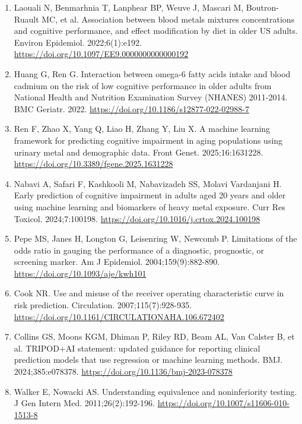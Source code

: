 \documentclass[12pt]{article}
\begin{document}
\begin{singlespace}
\begin{enumerate}
\item Laouali N, Benmarhnia T, Lanphear BP, Weuve J, Mascari M, Boutron-Ruault MC, et al. Association between blood metals mixtures concentrations and cognitive performance, and effect modification by diet in older US adults. Environ Epidemiol. 2022;6(1):e192. \url{https://doi.org/10.1097/EE9.0000000000000192}

\item Huang G, Ren G. Interaction between omega-6 fatty acids intake and blood cadmium on the risk of low cognitive performance in older adults from National Health and Nutrition Examination Survey (NHANES) 2011-2014. BMC Geriatr. 2022. \url{https://doi.org/10.1186/s12877-022-02988-7}

\item Ren F, Zhao X, Yang Q, Liao H, Zhang Y, Liu X. A machine learning framework for predicting cognitive impairment in aging populations using urinary metal and demographic data. Front Genet. 2025;16:1631228. \url{https://doi.org/10.3389/fgene.2025.1631228}

\item Nabavi A, Safari F, Kashkooli M, Nabavizadeh SS, Molavi Vardanjani H. Early prediction of cognitive impairment in adults aged 20 years and older using machine learning and biomarkers of heavy metal exposure. Curr Res Toxicol. 2024;7:100198. \url{https://doi.org/10.1016/j.crtox.2024.100198}

\item Pepe MS, Janes H, Longton G, Leisenring W, Newcomb P. Limitations of the odds ratio in gauging the performance of a diagnostic, prognostic, or screening marker. Am J Epidemiol. 2004;159(9):882-890. \url{https://doi.org/10.1093/aje/kwh101}

\item Cook NR. Use and misuse of the receiver operating characteristic curve in risk prediction. Circulation. 2007;115(7):928-935. \url{https://doi.org/10.1161/CIRCULATIONAHA.106.672402}

\item Collins GS, Moons KGM, Dhiman P, Riley RD, Beam AL, Van Calster B, et al. TRIPOD+AI statement: updated guidance for reporting clinical prediction models that use regression or machine learning methods. BMJ. 2024;385:e078378. \url{https://doi.org/10.1136/bmj-2023-078378}

\item Walker E, Nowacki AS. Understanding equivalence and noninferiority testing. J Gen Intern Med. 2011;26(2):192-196. \url{https://doi.org/10.1007/s11606-010-1513-8}


\end{enumerate}
\end{singlespace}
\end{document}

